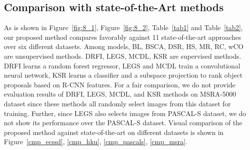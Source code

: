 \documentclass[journal]{IEEEtran}
\begin{document}
\subsection{Comparison with state-of-the-Art methods}
As is shown in Figure~\ref{fig:8_1}, Figure~\ref{fig:8_2}, Table~\ref{tab1} and Table~\ref{tab2}, our proposed method compares favorably against 11 state-of-the-art approaches over six different datasets. Among models, BL, BSCA, DSR, HS, MR, RC, wCO are unsupervised methods. DRFI, LEGS, MCDL, KSR are supervised methods. DRFI learns a random forest regressor, LEGS and MCDL train a convolutional neural network, KSR learns a classifier and a subspace projection to rank object proposals based on R-CNN features. For a fair comparison, we do not provide evaluation results of DRFI, LEGS, MCDL, and KSR methods on MSRA-5000 dataset since these methods all randomly select images from this dataset for training. Further, since LEGS also selects images from PASCAL-S dataset, we do not show its performance over the PASCAL-S dataset. Visual comparison of the proposed method against state-of-the-art on different datasets is shown in Figure~\ref{cmp_ecssd}, \ref{cmp_hku}, \ref{cmp_pascals}, \ref{cmp_msra}.
\end{document}
